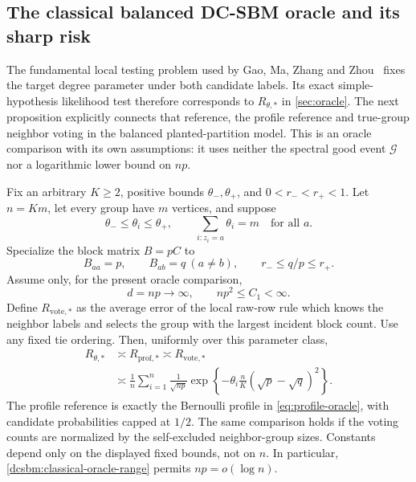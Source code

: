 \subsection{The classical balanced DC-SBM oracle and its sharp risk}
\label{dcsbm:classical-oracle}

The fundamental local testing problem used by
Gao, Ma, Zhang and Zhou~\cite{gmzz2018} fixes the target degree parameter
under both candidate labels. Its exact simple-hypothesis likelihood test
therefore corresponds to \(R_{\theta,*}\) in \cref{sec:oracle}.
The next proposition explicitly connects that reference, the profile
reference and true-group neighbor voting in the balanced planted-partition
model. This is an oracle comparison with its own assumptions:
it uses neither the spectral good event \(\mathcal G\) nor a logarithmic
lower bound on \(np\).

\begin{proposition}
\label{dcsbm:classical-bridge}
\label{prop:classical-dc-oracle-bridge}
Fix an arbitrary \(K\ge2\), positive bounds
\(\theta_-,\theta_+\), and \(0<r_-<r_+<1\).
Let \(n=Km\), let every group have \(m\) vertices, and suppose
\[
 \theta_-\le\theta_i\le\theta_+,\qquad
 \sum_{i:z_i=a}\theta_i=m\quad\text{for all }a.
\]
Specialize the block matrix \(B=pC\) to
\begin{equation}
 B_{aa}=p,\qquad B_{ab}=q\ (a\ne b),\qquad
 r_-\le q/p\le r_+ .
 \label{dcsbm:classical-model}
\end{equation}
Assume only, for the present oracle comparison,
\begin{equation}
 d=np\longrightarrow\infty,\qquad np^2\le C_1<\infty.
 \label{dcsbm:classical-oracle-range}
\end{equation}
Define \(R_{\mathrm{vote},*}\) as the average error of the local raw-row
rule which knows the neighbor labels and selects the group with the
largest incident block count. Use any fixed tie ordering.
Then, uniformly over this parameter class,
\begin{equation}
 \begin{aligned}
 R_{\theta,*}
 &\asymp R_{\mathrm{prof},*}
 \asymp R_{\mathrm{vote},*}\\
 &\asymp
 \frac1n\sum_{i=1}^n
 \frac1{\sqrt{np}}
 \exp\left\{-\theta_i\frac nK(\sqrt p-\sqrt q)^2\right\}.
 \end{aligned}
 \label{dcsbm:classical-risk}
\end{equation}
The profile reference is exactly the Bernoulli profile in
\eqref{eq:profile-oracle}, with candidate probabilities capped at \(1/2\).
The same comparison holds if the voting counts are normalized by the
self-excluded neighbor-group sizes. Constants depend only on the displayed
fixed bounds, not on \(n\). In particular,
\eqref{dcsbm:classical-oracle-range} permits \(np=o(\log n)\).
\end{proposition}

